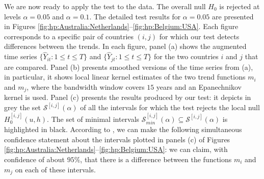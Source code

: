 \documentclass[12pt]{article}
\makeatletter
\renewcommand{\eqref}[1]{\tagform@{\ref{#1}}}
\makeatother
\begin{document}
We are now ready to apply the test to the data. The overall null $H_0$ is rejected at levels $\alpha = 0.05$ and $\alpha = 0.1$. The detailed test results for $\alpha =0.05$ are presented in Figures \ref{fig:hp:Australia:Netherlands}--\ref{fig:hp:Belgium:USA}. 
Each figure corresponds to a specific pair of countries $(i, j)$ for which our test detects differences between the trends. 
In each figure, panel (a) shows the augmented time series $\{\widehat{Y}_{it}: 1 \le t \le T\}$ and $\{\widehat{Y}_{jt}: 1 \le t \le T\}$ for the two countries $i$ and $j$ that are compared. 
Panel (b) presents smoothed versions of the time series from (a), in particular, it shows local linear kernel estimates of the two trend functions $m_i$ and $m_j$, where the bandwidth window covers $15$ years and an Epanechnikov kernel is used.
Panel (c) presents the results produced by our test: 
it depicts in grey the set $\mathcal{S}^{[i, j]}(\alpha)$ of all the intervals for which the test rejects the local null $H_0^{[i, j]}(u, h)$. The set of minimal intervals $\mathcal{S}^{[i, j]}_{min}(\alpha) \subseteq \mathcal{S}^{[i, j]}(\alpha)$ is highlighted in black. According to \eqref{eq:CS-v2}, we can make the following simultaneous confidence statement about the intervals plotted in panels (c) of Figures \ref{fig:hp:Australia:Netherlands}--\ref{fig:hp:Belgium:USA}: we can claim, with confidence of about $95\%$, that there is a difference between the functions $m_i$ and $m_j$ on each of these intervals. 


\end{document}

